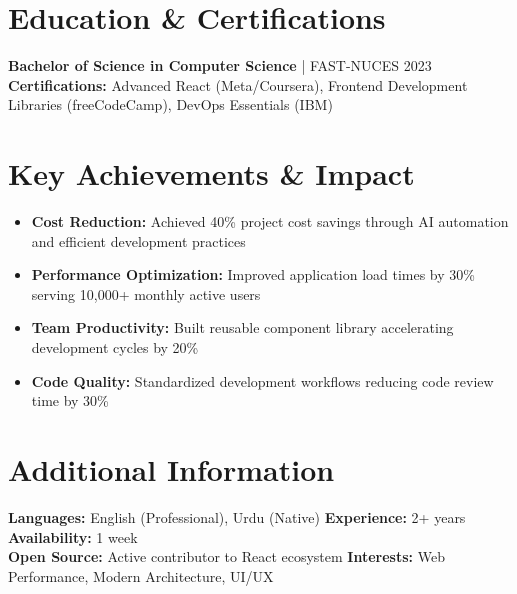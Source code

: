 \documentclass[10pt]{article}
\begin{document}
\section{Education \& Certifications}
\textbf{Bachelor of Science in Computer Science} | FAST-NUCES \hfill 2023 \\[2pt]
\textbf{Certifications:} Advanced React (Meta/Coursera), Frontend Development Libraries (freeCodeCamp), DevOps Essentials (IBM)

\section{Key Achievements \& Impact}
\begin{itemize}
\item \textbf{Cost Reduction:} Achieved 40\% project cost savings through AI automation and efficient development practices
\item \textbf{Performance Optimization:} Improved application load times by 30\% serving 10,000+ monthly active users
\item \textbf{Team Productivity:} Built reusable component library accelerating development cycles by 20\%
\item \textbf{Code Quality:} Standardized development workflows reducing code review time by 30\%
\end{itemize}

\section{Additional Information}
\textbf{Languages:} English (Professional), Urdu (Native) \quad \textbf{Experience:} 2+ years \quad \textbf{Availability:} 1 week \\
\textbf{Open Source:} Active contributor to React ecosystem \quad \textbf{Interests:} Web Performance, Modern Architecture, UI/UX
\end{document}
